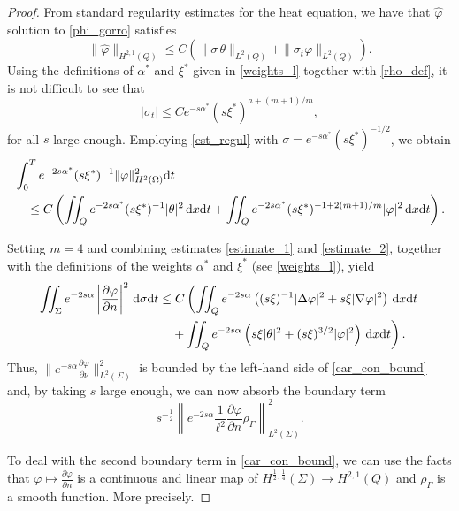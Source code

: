 \documentclass{aims}
\theoremstyle{definition}
\def\csbd{\rho_{\Gamma}}
\def\dx{\,\textnormal{d}x}
\def\dt{\textnormal{d}t}
\def\d{\,\textnormal{d}}
\begin{document}
\begin{proof}
From standard regularity estimates for the heat equation, we have that $\widehat{\varphi}$ solution to \eqref{phi_gorro} satisfies
%
\begin{equation}\label{est_regul}
\|\widehat{\varphi}\|_{H^{2,1}(Q)}\leq C\left(\|\sigma\,\theta\|_{L^2(Q)}+\|\sigma_t\varphi\|_{L^2(Q)}\right).
\end{equation}
%
Using the definitions of $\alpha^*$ and $\xi^*$ given in \eqref{weights_l} together with \eqref{rho_def}, it is not difficult to see that 
%
\begin{equation*}
|\sigma_t|\leq Ce^{-s\alpha^*}(s\xi^*)^{a+{(m+1)}/{m}},
\end{equation*}
%
for all $s$ large enough. Employing  \eqref{est_regul} with $\sigma=e^{-s\alpha^*}(s\xi^*)^{-1/2}$, we obtain
%
\begin{equation}\label{estimate_2}
\begin{split}
&\int_{0}^T e^{-2s\alpha^*}(s\xi^{*})^{-1}\|\varphi\|_{H^2(\Omega)}^2\dt \\
&\quad \leq C\left(\iint_Qe^{-2s\alpha^*}(s\xi^*)^{-1}|\theta|^2\dx\dt+\iint_Qe^{-2s\alpha^*}(s\xi^*)^{-1+2(m+1)/m}|\varphi|^2\dx\dt\right).
\end{split}
\end{equation}

Setting $m=4$ and combining estimates \eqref{estimate_1} and \eqref{estimate_2}, together with the definitions of the weights $\alpha^*$ and $\xi^*$ (see \eqref{weights_l}), yield
%
\begin{equation*}
\begin{split}
\iint_{\Sigma}e^{-2s\alpha}\left|\frac{\partial \varphi}{\partial n}\right|^2\d\sigma\dt
&\leq C\left(\iint_Q e^{-2s\alpha}\left((s\xi)^{-1}|\Delta \varphi|^2 + s\xi|\nabla \varphi|^2\right)\dx\dt \right.\\
&\quad \left.+\iint_Qe^{-2s\alpha}\left(s\xi|\theta|^2+(s\xi)^{3/2}|\varphi|^2\right)\dx\dt\right).
\end{split}
\end{equation*}
%
Thus, $\|e^{-s\alpha}\frac{\partial \varphi}{\partial \nu}\|_{L^2(\Sigma)}^2$ is bounded by the left-hand side of \eqref{car_con_bound} and, by taking $s$ large enough, we can now absorb the boundary term 
%
\begin{equation*}
s^{-\frac{1}{2}}\left\| e^{-2s\alpha} \frac{1}{\ell^2}\frac{\partial \varphi}{\partial n} \csbd \right\|^{2}_{L^2(\Sigma)}.
\end{equation*}

To deal with the second boundary term in \eqref{car_con_bound}, we can use the facts that $\varphi \mapsto \frac{\partial \varphi }{\partial n}$ is a continuous and linear map of $H^{\frac12,\frac14}(\Sigma)\to H^{2,1}(Q)$ and $\csbd$ is a smooth function. More precisely. 


\end{proof}
\end{document}
